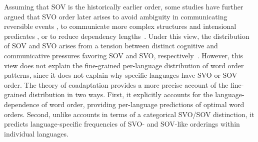 \documentclass[9pt,twocolumn,twoside,lineno]{pnas-new}
\begin{document}
Assuming that SOV is the historically earlier order, some studies have further argued that SVO order later arises to avoid ambiguity in communicating reversible events \citep{gibson-noisy-channel-2013, hall2013cognitive}, to communicate more complex structures \citep{langus2010cognitive, marno2015a, ferrer-i-cancho-placement-2017} and intensional predicates \citep{schouwstra-semantic-2011,napoli2017influence}, or to reduce dependency lengths~\citep{ferrer-i-cancho-placement-2017}.
Under this view, the distribution of SOV and SVO arises from a tension between distinct cognitive and communicative pressures favoring SOV and SVO, respectively~\citep{langus2010cognitive}.
However, this view does not explain the fine-grained per-language distribution of word order patterns, since it does not explain why specific languages have SVO or SOV order.
The theory of coadaptation provides a more precise account of the fine-grained distribution in two ways. First, it explicitly accounts for the language-dependence of word order, providing per-language predictions of optimal word orders.
Second, unlike accounts in terms of a categorical SVO/SOV distinction, it predicts language-specific frequencies of SVO- and SOV-like orderings within individual languages.












\end{document}
